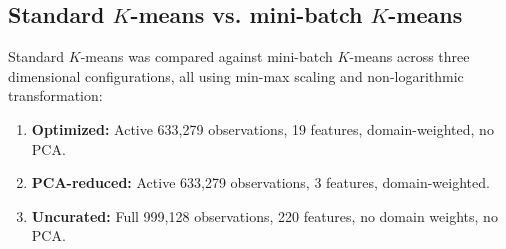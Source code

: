 \subsection{Standard $K$-means vs. mini-batch $K$-means}
\label{subsec:results_mbkmeans}

Standard $K$-means was compared against mini-batch $K$-means across three dimensional configurations, all using min-max scaling and non-logarithmic transformation:

\begin{enumerate}
    \item \textbf{Optimized:} Active 633,279 observations, 19 features, domain-weighted, no PCA.
    \item \textbf{PCA-reduced:} Active 633,279 observations, 3 features, domain-weighted.
    \item \textbf{Uncurated:} Full 999,128 observations, 220 features, no domain weights, no PCA.
\end{enumerate}

